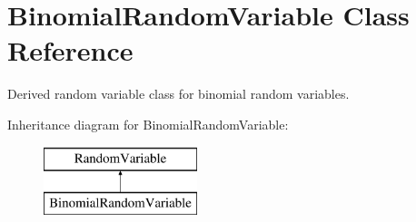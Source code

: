 \section{Binomial\+Random\+Variable Class Reference}
\label{classPecos_1_1BinomialRandomVariable}


Derived random variable class for binomial random variables.  


Inheritance diagram for Binomial\+Random\+Variable\+:\begin{figure}[H]
\begin{center}
\leavevmode
\includegraphics[height=2.000000cm]{classPecos_1_1BinomialRandomVariable}
\end{center}
\end{figure}
